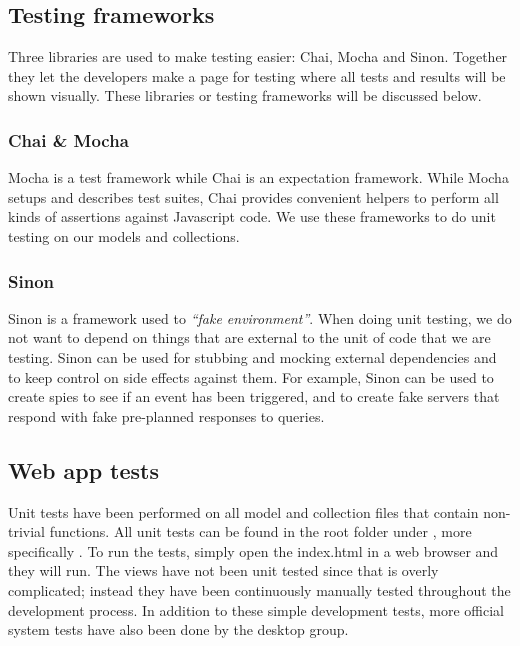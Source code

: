 \subsection{Testing frameworks}
Three libraries are used to make testing easier: Chai, Mocha and Sinon. Together they let the developers make a page for testing where all tests and results will be shown visually.
These libraries or testing frameworks will be discussed below.
\subsubsection{Chai \& Mocha}
Mocha\cite{web_8} is a test framework while Chai\cite{web_7} is an expectation framework. While Mocha setups and describes test suites, Chai provides convenient helpers to perform all kinds of assertions against Javascript code. We use these frameworks to do unit testing on our models and collections.

\subsubsection{Sinon}
Sinon\cite{web_9} is a framework used to \textit{“fake environment”}. When doing unit testing, we do not want to depend on things that are external to the unit of code that we are testing. Sinon can be used for stubbing and mocking external dependencies and to keep control on side effects against them. For example, Sinon can be used to create spies to see if an event has been triggered, and to create fake servers that respond with fake pre-planned responses to queries.

\subsection{Web app tests}
Unit tests have been performed on all model and collection files that contain non-trivial functions. All unit tests can be found in the root folder under , more specifically . To run the tests, simply open the index.html in a web browser and they will run. The views have not been unit tested since that is overly complicated; instead they have been continuously manually tested throughout the development process. In addition to these simple development tests, more official system tests have also been done by the desktop group.

